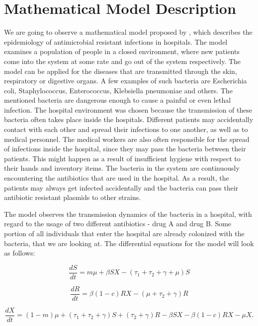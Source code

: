 \chapter*{Mathematical Model Description}


We are going to observe a mathematical model proposed by \cite{lips}, which describes the epidemiology of antimicrobial resistant infections in hospitals. The model examines a population of people in a closed environment, where new patients come into the system at some rate and go out of the system respectively. The model can be applied for the diseases that are transmitted through the skin, respiratory or digestive organs. A few examples of such bacteria are Escherichia coli, Staphylococcus, Enterococcus, Klebsiella pneumoniae and others. The mentioned bacteria are dangerous enough to cause a painful or even lethal infection. The hospital environment was chosen because the transmission of these bacteria often takes place inside the hospitals. Different patients may accidentally contact with each other and spread their infections to one another, as well as to medical personnel. The medical workers are also often responsible for the spread of infections inside the hospital, since they may pass the bacteria between their patients. This might happen as a result of insufficient hygiene with respect to their hands and inventory items. The bacteria in the system are continuously encountering the antibiotics that are used in the hospital. As a result, the patients may always get infected accidentally and the bacteria can pass their antibiotic resistant plasmids to other strains.

The model observes the transmission dynamics of the bacteria in a hospital, with regard to the usage of two different antibiotics - drug A and drug B. Some portion of all individuals that enter the hospital are already colonized with the bacteria, that we are looking at. The differential equations for the model will look as follows:

\begin{equation}
\frac{dS}{dt} = m \mu + \beta S X - (\tau_1 + \tau_2 + \gamma + \mu) S
\end{equation}

\begin{equation}
\frac{dR}{dt} = \beta (1 - c) R X - (\mu + \tau_2 + \gamma) R
\end{equation}

\begin{equation}
\frac{dX}{dt} = (1 - m) \mu + (\tau_1 + \tau_2 + \gamma) S + (\tau_2 + \gamma) R - \beta S X - \beta (1-c) R X - \mu X.
\end{equation}